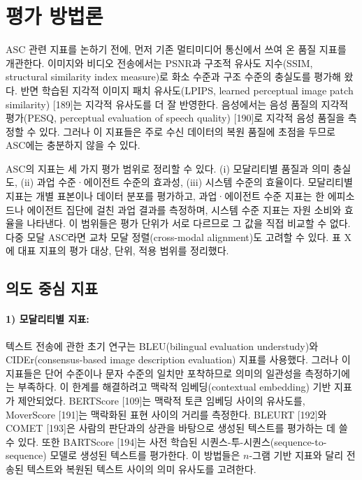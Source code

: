 \section{평가 방법론}

ASC 관련 지표를 논하기 전에, 먼저 기존 멀티미디어 통신에서 쓰여 온 품질 지표를 개관한다. 이미지와 비디오 전송에서는 PSNR과 구조적 유사도 지수(SSIM, structural similarity index measure)로 화소 수준과 구조 수준의 충실도를 평가해 왔다. 반면 학습된 지각적 이미지 패치 유사도(LPIPS, learned perceptual image patch similarity) [189]는 지각적 유사도를 더 잘 반영한다. 음성에서는 음성 품질의 지각적 평가(PESQ, perceptual evaluation of speech quality) [190]로 지각적 음성 품질을 측정할 수 있다. 그러나 이 지표들은 주로 수신 데이터의 복원 품질에 초점을 두므로 ASC에는 충분하지 않을 수 있다.

ASC의 지표는 세 가지 평가 범위로 정리할 수 있다. (i) 모달리티별 품질과 의미 충실도, (ii) 과업 수준·에이전트 수준의 효과성, (iii) 시스템 수준의 효율이다. 모달리티별 지표는 개별 표본이나 데이터 분포를 평가하고, 과업·에이전트 수준 지표는 한 에피소드나 에이전트 집단에 걸친 과업 결과를 측정하며, 시스템 수준 지표는 자원 소비와 효율을 나타낸다. 이 범위들은 평가 단위가 서로 다르므로 그 값을 직접 비교할 수 없다. 다중 모달 ASC라면 교차 모달 정렬(cross-modal alignment)도 고려할 수 있다. 표 X에 대표 지표의 평가 대상, 단위, 적용 범위를 정리했다.

\subsection{의도 중심 지표}

\paragraph{1) 모달리티별 지표:}
텍스트 전송에 관한 초기 연구는 BLEU(bilingual evaluation understudy)와 CIDEr(consensus-based image description evaluation) 지표를 사용했다. 그러나 이 지표들은 단어 수준이나 문자 수준의 일치만 포착하므로 의미의 일관성을 측정하기에는 부족하다. 이 한계를 해결하려고 맥락적 임베딩(contextual embedding) 기반 지표가 제안되었다. BERTScore [109]는 맥락적 토큰 임베딩 사이의 유사도를, MoverScore [191]는 맥락화된 표현 사이의 거리를 측정한다. BLEURT [192]와 COMET [193]은 사람의 판단과의 상관을 바탕으로 생성된 텍스트를 평가하는 데 쓸 수 있다. 또한 BARTScore [194]는 사전 학습된 시퀀스-투-시퀀스(sequence-to-sequence) 모델로 생성된 텍스트를 평가한다. 이 방법들은 $n$-그램 기반 지표와 달리 전송된 텍스트와 복원된 텍스트 사이의 의미 유사도를 고려한다.

